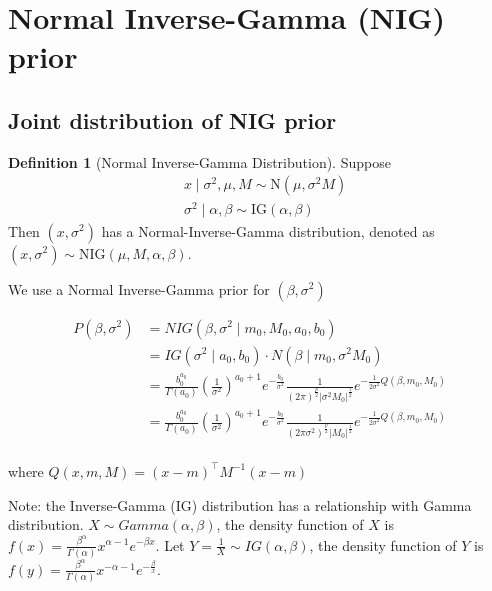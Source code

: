 \documentclass[
]{book}
\theoremstyle{definition}
\newtheorem{definition}{Definition}[chapter]
\theoremstyle{definition}
\theoremstyle{definition}
\theoremstyle{definition}
\theoremstyle{remark}
\begin{document}
\hypertarget{normal-inverse-gamma-nig-prior}{%
\section{Normal Inverse-Gamma (NIG) prior}\label{normal-inverse-gamma-nig-prior}}

\hypertarget{joint-distribution-of-nig-prior}{%
\subsection{Joint distribution of NIG prior}\label{joint-distribution-of-nig-prior}}

\begin{definition}[Normal Inverse-Gamma Distribution]
\protect\hypertarget{def:NIG}{}\label{def:NIG}Suppose
\[
\begin{aligned}
& x \mid \sigma^2, \mu, M \sim \text{N}(\mu,\sigma^2 M) \\
& \sigma^2 \mid \alpha, \beta \sim \text{IG}(\alpha,\beta) 
\end{aligned}
\]
Then \((x,\sigma^2)\) has a Normal-Inverse-Gamma distribution, denoted as \((x,\sigma^2) \sim \text{NIG}(\mu,M,\alpha,\beta)\).
\end{definition}

We use a Normal Inverse-Gamma prior for \((\beta, \sigma^2)\)

\begin{align}
    P(\beta, \sigma^{2})
    &= NIG \left(\beta, \sigma^{2} \mid m_{0}, M_{0}, a_{0}, b_{0}\right) \\
    &= IG\left(\sigma^{2} \mid a_{0}, b_{0}\right) \cdot N\left(\beta \mid m_{0}, \sigma^{2} M_{0}\right) \\
    &= \frac{b_0^{a_0}}{\Gamma\left(a_{0}\right)}
    \left(\frac{1}{\sigma^{2}}\right)^{a_{0}+1} e^{-\frac{b_{0}}{\sigma^{2}}} \frac{1}{(2 \pi)^{\frac{p}{2}}\left|\sigma^{2} M_{0}\right|^{\frac{1}{2}}} e^{-\frac{1}{2 \sigma^{2}} Q \left(\beta, m_{0}, M_{0}\right)} \\
    &= \frac{b_0^{a_0}}{\Gamma\left(a_{0}\right)}
    \left(\frac{1}{\sigma^{2}}\right)^{a_{0}+1} e^{-\frac{b_{0}}{\sigma^{2}}} \frac{1}{(2 \pi \sigma^{2})^{\frac{p}{2}}\left| M_{0}\right|^{\frac{1}{2}}} e^{-\frac{1}{2 \sigma^{2}} Q \left(\beta, m_{0}, M_{0}\right)} \\
\end{align}

where \(Q(x, m, M)=(x-m)^{\top} M^{-1} (x-m)\)

Note: the Inverse-Gamma (IG) distribution has a relationship with Gamma distribution. \(X \sim Gamma(\alpha, \beta)\), the density function of \(X\) is \(f(x)=\frac{\beta^{\alpha}}{\Gamma(\alpha)} x^{\alpha-1} e^{-\beta x}\). Let \(Y=\frac{1}{X} \sim IG(\alpha, \beta)\), the density function of \(Y\) is \(f(y)=\frac{\beta^{\alpha}}{\Gamma(\alpha)} x^{-\alpha-1} e^{-\frac{\beta}{x}}\).
\end{document}

